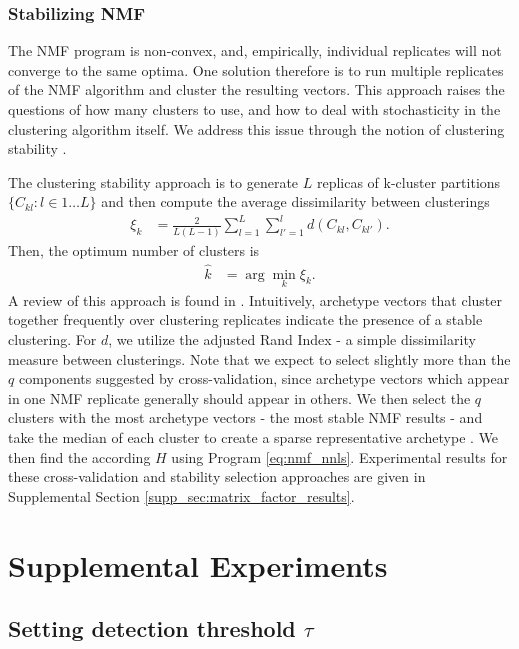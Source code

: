 \subsubsection{Stabilizing NMF}

The NMF program is non-convex, and, empirically, individual replicates will not converge to the same optima.
One solution therefore is to run multiple replicates of the NMF algorithm and cluster the resulting vectors.
This approach raises the questions of how many clusters to use, and how to deal with stochasticity in the clustering algorithm itself.
We address this issue through the notion of clustering stability \citep{Von_Luxburg2010-lu}.

The clustering stability approach is to generate $L$ replicas of k-cluster partitions $\{C_{kl} : l \in 1 \dots L\}$ and then compute the average dissimilarity between clusterings
\begin{align*}
\xi_k &= \frac{2}{L(L - 1)} \sum_{l = 1}^{L} \sum_{l'= 1}^{l}  d(C_{kl}, C_{kl'}).
\end{align*}
Then, the optimum number of clusters is 
\begin{align*}
\hat k &= \arg \min_k \xi_k.
\end{align*}
A review of this approach is found in \citet{Von_Luxburg2010-qe}.
Intuitively, archetype vectors that cluster together frequently over clustering replicates indicate the presence of a stable clustering.
For $d$, we utilize the adjusted Rand Index - a simple dissimilarity measure between clusterings.
Note that we expect to select slightly more than the $q$ components suggested by cross-validation, since archetype vectors which appear in one NMF replicate generally should appear in others.
We then select the $q$ clusters with the most archetype vectors - the most stable NMF results - and take the median of each cluster to create a sparse representative archetype \citet{Wu2016-gg, Kotliar2019-yj}.
We then find the according $H$ using Program \ref{eq:nmf_nnls}.
Experimental results for these cross-validation and stability selection approaches are given in Supplemental Section \ref{supp_sec:matrix_factor_results}.

\newpage

\section{Supplemental Experiments}
\label{supp_sec:exp}

\subsection{Setting detection threshold $\tau$}
\label{supp:exp_lower}

